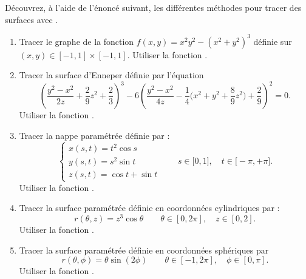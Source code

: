 \documentclass[class=report,crop=false]{standalone}
\begin{document}
Découvrez, à l'aide de l'énoncé suivant, les différentes méthodes 
pour tracer des surfaces avec \Sage.

\begin{tp}
\sauteligne
\begin{enumerate}
  \item Tracer le graphe de la fonction $f(x,y)= x^2y^2-(x^2+y^2)^3$ définie
  sur $(x,y) \in [-1,1]\times[-1,1]$. Utiliser la fonction .
  
  \item Tracer la surface d'Enneper
  définie par l'équation 
  $$\left( \frac{y^2-x^2}{2z}+\frac29z^2+\frac23\right)^3-
  6\left( \frac{y^2-x^2}{4z}-\frac14\big(x^2+y^2+\frac89z^2\big)+\frac29 \right)^2=0.$$
  Utiliser la fonction .

  
  \item Tracer la nappe paramétrée définie par :
  $$\left\{
  \begin{array}{l}
  x(s,t) =  t^2 \cos s\\[1mm]
  y(s,t) =  s^2 \sin t\\[1mm]
  z(s,t) = \cos t+ \sin t
  \end{array}
  \right.\qquad  s \in \big[0,1\big], \quad t \in \big[-\pi,+\pi\big].$$
  Utiliser la fonction .
  
  \item Tracer la surface paramétrée définie en coordonnées cylindriques par :
  $$r(\theta,z) = z^3 \cos \theta \qquad \theta \in [0,2\pi], \quad z \in [0,2].$$  
  Utiliser la fonction .
  
  \item Tracer la surface paramétrée définie en coordonnées sphériques par 
  $$r(\theta,\phi)  = \theta \sin(2\phi) \qquad \theta \in [-1,2\pi], \quad  \phi \in [0,\pi].$$
  Utiliser la fonction .  
\end{enumerate}
\end{tp}


\end{document}

